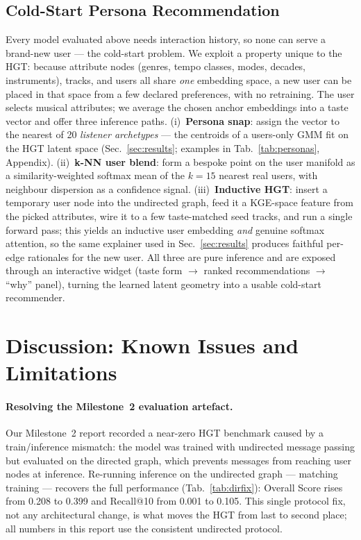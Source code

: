\documentclass[10pt,twocolumn,letterpaper]{article}
\begin{document}
\subsection{Cold-Start Persona Recommendation}
\label{sec:coldstart}
Every model evaluated above needs interaction history, so none can serve a brand-new
user --- the cold-start problem. We exploit a property unique to the HGT: because
attribute nodes (genres, tempo classes, modes, decades, instruments), tracks, and
users all share \emph{one} embedding space, a new user can be placed in that space
from a few declared preferences, with no retraining. The user selects musical
attributes; we average the chosen anchor embeddings into a taste vector and offer
three inference paths. (i)~\textbf{Persona snap}: assign the vector to the nearest
of 20 \emph{listener archetypes} --- the centroids of a users-only GMM fit on the
HGT latent space (Sec.~\ref{sec:results}; examples in Tab.~\ref{tab:personas},
Appendix). (ii)~\textbf{k-NN
user blend}: form a bespoke point on the user manifold as a similarity-weighted
softmax mean of the $k{=}15$ nearest real users, with neighbour dispersion as a
confidence signal. (iii)~\textbf{Inductive HGT}: insert a temporary user node into
the undirected graph, feed it a KGE-space feature from the picked attributes, wire
it to a few taste-matched seed tracks, and run a single forward pass; this yields an
inductive user embedding \emph{and} genuine softmax attention, so the same explainer
used in Sec.~\ref{sec:results} produces faithful per-edge rationales for the new
user. All three are pure inference and are exposed through an interactive widget
(taste form $\rightarrow$ ranked recommendations $\rightarrow$ ``why'' panel),
turning the learned latent geometry into a usable cold-start recommender.

\section{Discussion: Known Issues and Limitations}
\label{sec:discussion}

\paragraph{Resolving the Milestone~2 evaluation artefact.} Our Milestone~2 report
recorded a near-zero HGT benchmark caused by a train/inference mismatch: the model
was trained with undirected message passing but evaluated on the directed graph,
which prevents messages from reaching user nodes at inference. Re-running inference
on the undirected graph --- matching training --- recovers the full performance
(Tab.~\ref{tab:dirfix}): Overall Score rises from 0.208 to 0.399 and Recall@10 from
0.001 to 0.105. This single protocol fix, not any architectural change, is what
moves the HGT from last to second place; all numbers in this report use the
consistent undirected protocol.
\end{document}
